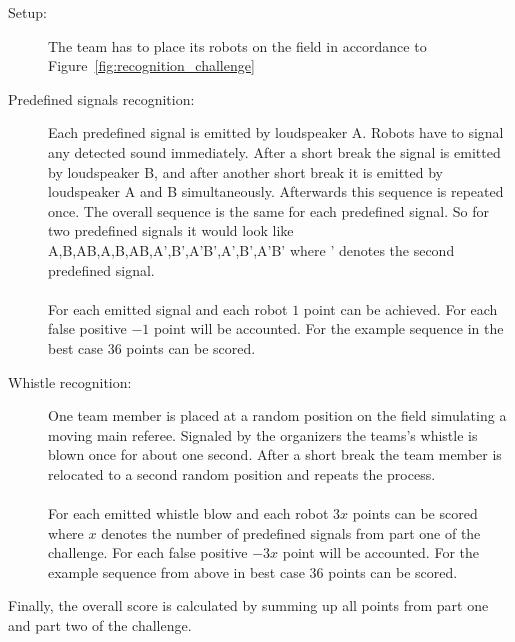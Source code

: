\documentclass[12pt]{article}
\begin{document}
\begin{description}
	\item[Setup:] The team has to place its robots on the field in accordance to Figure~\ref{fig:recognition_challenge}
	\item[Predefined signals recognition:] Each predefined signal is emitted by loudspeaker A. Robots have to signal any detected sound immediately. After a short break the signal is emitted by loudspeaker B, and after another short break it is emitted by loudspeaker A and B simultaneously. Afterwards this sequence is repeated once. The overall sequence is the same for each predefined signal. So for two predefined signals it would look like A,B,AB,A,B,AB,A',B',A'B',A',B',A'B' where ' denotes the second predefined signal.\\
	\\For each emitted signal and each robot $1$ point can be achieved. For each false positive $-1$ point will be accounted. For the example sequence in the best case $36$ points can be scored.
	\item[Whistle recognition:] One team member is placed at a random position on the field simulating a moving main referee. Signaled by the organizers the teams's whistle is blown once for about one second. After a short break the team member is relocated to a second random position and repeats the process.\\
	\\ For each emitted whistle blow and each robot $3x$ points can be scored where $x$ denotes the number of predefined signals from part one of the challenge. For each false positive $-3x$ point will be accounted. For the example sequence from above in best case $36$ points can be scored.
\end{description}

Finally, the overall score is calculated by summing up all points from part one and part two of the challenge.
\end{document}
